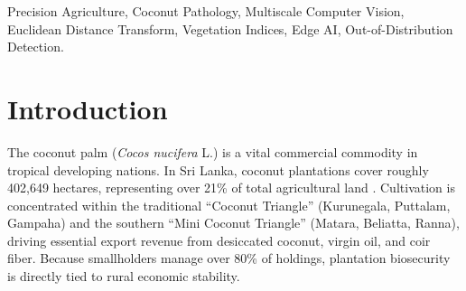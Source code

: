 \documentclass[conference,a4paper]{IEEEtran}
\begin{document}
\begin{abstract}
The coconut palm (\textit{Cocos nucifera} L.) sustains rural livelihoods across tropical regions, yet destructive pathogens, including Weligama Coconut Leaf Wilt Disease,Bud Rot, Stem Bleeding, and Leaf Rot, threaten plantation yields. Existing monitoring approaches suffer from a scale disconnect: drone surveys provide broad acreage coverage but lack lesion-level diagnostic precision, whereas mobile classifiers operate in isolation and fail in rural zero-connectivity zones. We present a bridged computer vision architecture combining macroscopic aerial surveillance with offline-first microscopic edge diagnostics. System~A employs deterministic mathematical morphology via Excess-Green filtering and Euclidean Distance Transform to automatically detect 938 palm crowns in 100.9\,ms without manual annotations, then applies local spatial statistics to isolate 21 early stress hotspots. System~B deploys an INT8-quantized MobileNetV2 model (2.71\,MB) with calibrated out-of-distribution rejection for rapid field diagnosis on budget smartphones, achieving 91.42\% accuracy across six pathological classes (Cohen's $\kappa = 0.8954$) on un-augmented field data ($N = 233$). Diagnostic telemetry is coordinated through an offline-first SQLite queue that synchronizes with cloud services upon network restoration, embedding Coconut Research Institute treatment protocols. Validations on commercial plantation imagery demonstrate responsive real-time operation (11.76\,ms per inference on CPU; 68.2\,ms on budget processors) and actionable biosecurity coordination for resource-constrained smallholders.
\end{abstract}

\begin{IEEEkeywords}
Precision Agriculture, Coconut Pathology, Multiscale Computer Vision, Euclidean Distance Transform, Vegetation Indices, Edge AI, Out-of-Distribution Detection.
\end{IEEEkeywords}

\section{Introduction}
The coconut palm (\textit{Cocos nucifera} L.) is a vital commercial commodity in tropical developing nations. In Sri Lanka, coconut plantations cover roughly 402,649 hectares, representing over 21\% of total agricultural land \cite{b1}. Cultivation is concentrated within the traditional ``Coconut Triangle'' (Kurunegala, Puttalam, Gampaha) and the southern ``Mini Coconut Triangle'' (Matara, Beliatta, Ranna), driving essential export revenue from desiccated coconut, virgin oil, and coir fiber. Because smallholders manage over 80\% of holdings, plantation biosecurity is directly tied to rural economic stability.
\end{document}
